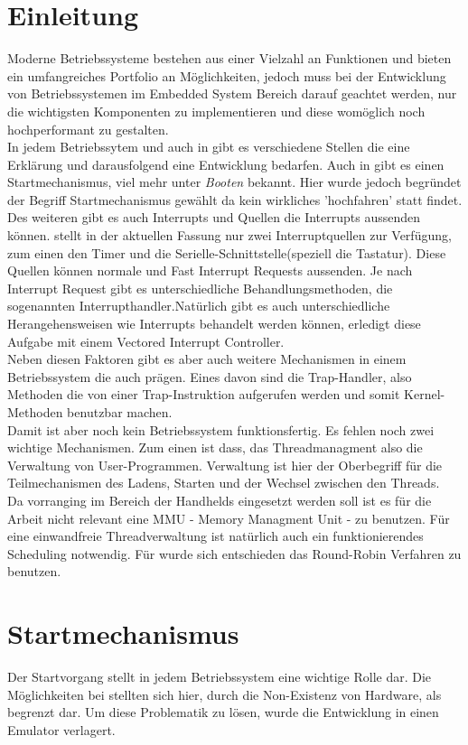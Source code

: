 \section{Einleitung}
Moderne Betriebssysteme bestehen aus einer Vielzahl an Funktionen und bieten ein umfangreiches Portfolio an M\"oglichkeiten, jedoch muss bei der Entwicklung von Betriebssystemen im Embedded System Bereich darauf geachtet werden, nur die wichtigsten Komponenten zu implementieren und diese wom\"oglich noch hochperformant zu gestalten.\\
In jedem Betriebssytem und auch in \mops gibt es verschiedene Stellen die eine Erkl\"arung und darausfolgend eine Entwicklung bedarfen. Auch in \mops gibt es einen Startmechanismus, viel mehr unter \textit{Booten} bekannt. Hier wurde jedoch begr\"undet der Begriff Startmechanismus gew\"ahlt da kein wirkliches 'hochfahren' statt findet.\\
Des weiteren gibt es auch Interrupts und Quellen die Interrupts aussenden k\"onnen. \mops stellt in der aktuellen Fassung nur zwei Interruptquellen zur Verf\"ugung, zum einen den Timer und die Serielle-Schnittstelle(speziell die Tastatur). Diese Quellen k\"onnen normale und Fast Interrupt Requests aussenden. Je nach Interrupt Request gibt es unterschiedliche Behandlungsmethoden, die sogenannten Interrupthandler.Nat\"urlich gibt es auch unterschiedliche Herangehensweisen wie Interrupts behandelt werden k\"onnen, \mops erledigt diese Aufgabe mit einem Vectored Interrupt Controller.\\
Neben diesen Faktoren gibt es aber auch weitere Mechanismen in einem Betriebssystem die auch \mops pr\"agen. Eines davon sind die Trap-Handler, also Methoden die von einer Trap-Instruktion aufgerufen werden und somit Kernel-Methoden benutzbar machen.\\
Damit ist aber noch kein Betriebssystem funktionsfertig. Es fehlen noch zwei wichtige Mechanismen. Zum einen ist dass, das Threadmanagment also die Verwaltung von User-Programmen. Verwaltung ist hier der Oberbegriff f\"ur die Teilmechanismen des Ladens, Starten und der Wechsel zwischen den Threads.\\
Da \mops vorranging im Bereich der Handhelds eingesetzt werden soll ist es f\"ur die Arbeit nicht relevant eine MMU - Memory Managment Unit - zu benutzen. F\"ur eine einwandfreie Threadverwaltung ist nat\"urlich auch ein funktionierendes Scheduling notwendig. F\"ur \mops wurde sich entschieden das Round-Robin Verfahren zu benutzen.
\section{Startmechanismus}
Der Startvorgang stellt in jedem Betriebssystem eine wichtige Rolle dar. Die M\"oglichkeiten bei \mops stellten sich hier, durch die Non-Existenz von Hardware, als begrenzt dar. Um diese Problematik zu l\"osen, wurde die Entwicklung in einen Emulator verlagert.
